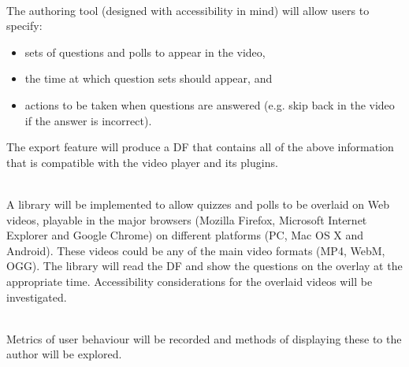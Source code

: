 \begin{description}[%
  before={\setcounter{descriptcount}{0}},%
  ,font=\bfseries\stepcounter{descriptcount}\thedescriptcount~]
	\item[Quiz Authoring Tool] \hfill \\
	The authoring tool (designed with accessibility in mind) will allow users to specify:

	\begin{itemize}
		\item sets of questions and polls to appear in the video,
		\item the time at which question sets should appear, and
		\item actions to be taken when questions are answered (e.g. skip back in the video if the answer is incorrect).
	\end{itemize}

	The export feature will produce a \gls{DF} that contains all of the above information that is compatible with the video player and its plugins.

	\item[Questions Overlay] \hfill \\
	A library will be implemented to allow quizzes and polls to be overlaid on Web videos, playable in the major browsers (Mozilla Firefox, Microsoft Internet Explorer and Google Chrome) on different platforms (PC, Mac OS X and Android). These videos could be any of the main video formats (MP4, WebM, OGG). The library will read the \gls{DF} and show the questions on the overlay at the appropriate time. Accessibility considerations for the overlaid videos will be investigated.

	\item[Video and Quiz Analytics] \hfill \\
	Metrics of user behaviour will be recorded and methods of displaying these to the author will be explored.
\end{description}
